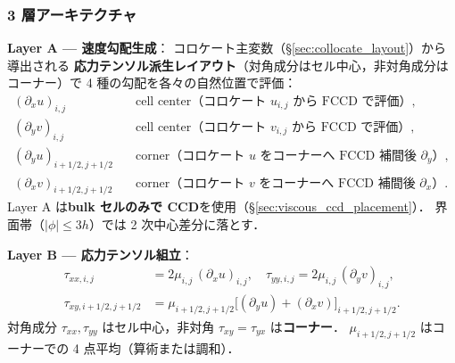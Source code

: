 \subsubsection{3 層アーキテクチャ}
\label{sec:viscous_three_layers}

\noindent\textbf{Layer A — 速度勾配生成}：
コロケート主変数（\S\ref{sec:collocate_layout}）から導出される
\textbf{応力テンソル派生レイアウト}（対角成分はセル中心，非対角成分はコーナー）で
4 種の勾配を各々の自然位置で評価：
\begin{align}
  (\partial_x u)_{i,j} &\quad\text{cell center（コロケート $u_{i,j}$ から FCCD で評価）}, \label{eq:viscous_layerA_1}\\
  (\partial_y v)_{i,j} &\quad\text{cell center（コロケート $v_{i,j}$ から FCCD で評価）}, \label{eq:viscous_layerA_2}\\
  (\partial_y u)_{i+1/2,j+1/2} &\quad\text{corner（コロケート $u$ をコーナーへ FCCD 補間後 $\partial_y$）}, \label{eq:viscous_layerA_3}\\
  (\partial_x v)_{i+1/2,j+1/2} &\quad\text{corner（コロケート $v$ をコーナーへ FCCD 補間後 $\partial_x$）}. \label{eq:viscous_layerA_4}
\end{align}
Layer A は\textbf{bulk セルのみで CCD}を使用（\S\ref{sec:viscous_ccd_placement}）．
界面帯（$|\phi|\le 3h$）では 2 次中心差分に落とす．

\noindent\textbf{Layer B — 応力テンソル組立}：
\begin{align}
  \tau_{xx,i,j} &= 2\mu_{i,j}\,(\partial_x u)_{i,j}, \quad
  \tau_{yy,i,j} = 2\mu_{i,j}\,(\partial_y v)_{i,j}, \label{eq:viscous_layerB_diag}\\
  \tau_{xy,i+1/2,j+1/2} &= \mu_{i+1/2,j+1/2}\bigl[(\partial_y u) + (\partial_x v)\bigr]_{i+1/2,j+1/2}. \label{eq:viscous_layerB_off}
\end{align}
対角成分 $\tau_{xx},\tau_{yy}$ はセル中心，非対角 $\tau_{xy}=\tau_{yx}$ は\textbf{コーナー}．
$\mu_{i+1/2,j+1/2}$ はコーナーでの 4 点平均（算術または調和）．

